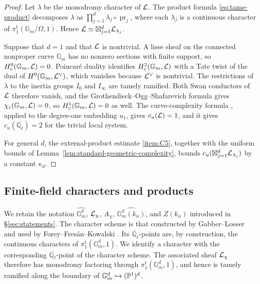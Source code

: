 \documentclass[12pt,reqno]{amsart}
\theoremstyle{definition}
\theoremstyle{plain}
\theoremstyle{definition}
\theoremstyle{remark}
\newcommand{\bbG}{\mathbb{G}}  \newcommand{\bbH}{\mathbb{H}}
\newcommand{\bbQ}{\mathbb{Q}}  \newcommand{\bbR}{\mathbb{R}}
\newcommand{\ol}[1]{\overline{#1}}
\newcommand{\Ql}{\bbQ_{\ell}}
\newcommand{\Gm}{\bbG_m}
\newcommand{\cu}{c_u}
\begin{document}
\begin{proof}
Let \(\lambda\) be the monodromy character of \(\mathcal{L}\).  The product formula \eqref{eq:tame-product}
decomposes \(\lambda\) as \(\prod_{j=1}^d\lambda_j\circ\operatorname{pr}_j\), where each \(\lambda_j\)
is a continuous character of \(\pi_1^{\mathrm t}(\Gm/\Omega,1)\).  Hence
\(\mathcal{L}\simeq\boxtimes_{j=1}^d\mathcal{L}_{\lambda_j}\).

Suppose that \(d=1\) and that \(\mathcal{L}\) is nontrivial.  A lisse sheaf on the connected nonproper curve
\(\Gm\) has no nonzero sections with finite support, so \(H^0_c(\Gm,\cL)=0\).  Poincar\'e duality
identifies \(H^2_c(\Gm,\cL)\) with a Tate twist of the dual of \(H^0(\Gm,\cL^\vee)\), which vanishes
because \(\mathcal{L}^\vee\) is nontrivial.  The restrictions of \(\lambda\) to the inertia groups \(I_0\) and
\(I_\infty\) are tamely ramified.  Both Swan conductors of \(\mathcal{L}\) therefore vanish, and the
Grothendieck--Ogg--Shafarevich formula \cite[\textit{Sommes trigonom\'etriques}, (3.2.1)]{SGA45}
gives \(\chi_c(\Gm,\cL)=0\), so \(H^1_c(\Gm,\cL)=0\) as well.  The curve-complexity formula
\cite[Th.~7.3(1)]{SFFK23}, applied to the degree-one embedding \(u_1\), gives \(\cu(\cL)=1\), and it
gives \(\cu(\ol\Ql)=2\) for the trivial local system.

For general \(d\), the external-product estimate \ref{item:C5}, together with the uniform bounds of
Lemma~\ref{lem:standard-geometric-complexity}, bounds
\(\cu(\boxtimes_{j=1}^d\cL_{\lambda_j})\) by a constant \(\kappa_d\).
\end{proof}

\subsection{Finite-field characters and products}
\label{sec:characters}

We retain the notation \(\widehat{\Gm^d}\), \(\mathcal{L}_\chi\), \(A_\chi\),
\(\widehat{\Gm^d(k_n)}\), and \(Z(k_n)\) introduced in \S\ref{sec:statements}.  The character scheme
is that constructed by Gabber--Loeser \cite[\S3.2]{GabberLoeser1996} and used by
Forey--Fres\'an--Kowalski \cite{ForeyFresanKowalski2021}.  Its \(\ol\Ql\)-points are, by construction,
the continuous characters of \(\pi_1^{\mathrm t}(\Gm^d,1)\).  We identify a character with the
corresponding \(\ol\Ql\)-point of the character scheme.  The associated sheaf \(\mathcal{L}_\chi\) therefore has
monodromy factoring through \(\pi_1^{\mathrm t}(\Gm^d,1)\), and hence is tamely ramified along the
boundary of \(\Gm^d\hookrightarrow(\bbP^1)^d\).
\end{document}
